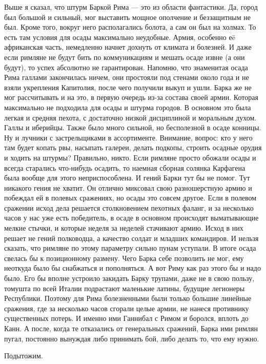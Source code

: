 Выше я сказал, что штурм Баркой Рима — это из области фантастики. Да, город был большой и сильный, мог выставить мощное ополчение и беззащитным не был. Кроме того, вокруг него располагались болота, а сам он был на холмах. То есть там условия для осады максимально неудобные. Армия, особенно еë африканская часть, немедленно начнет дохнуть от климата и болезней. И даже если римляне не будут бить по коммуникациям и мешать осаде извне (а они будут), то успех абсолютно не гарантирован. Напомню, что знаменитая осада Рима галлами закончилась ничем, они простояли под стенами около года и не взяли укрепления Капитолия, после чего получили выкуп и ушли. Барка же не мог рассчитывать и на это, в первую очередь из-за состава своей армии. Которая максимально не подходила для осады и штурма городов. В основном это была легкая и средняя пехота, с достаточно низкой дисциплиной и моральным духом. Галлы и иберийцы. Также было много сильной, но бесполезной в осаде конницы. Ну и лучники с застрельщиками в ассортименте. Внимание, вопрос: кто у него там будет копать рвы, насыпать галереи, делать подкопы, строить осадные орудия и ходить на штурмы? Правильно, никто. Если римляне просто обожали осады и всегда старались что-нибудь осадить, то наемная сборная солянка Карфагена была вообще для этого неприспособлена. И гений Барки тут бы не помог. Тут никакого гения не хватит. Он отлично миксовал свою разношерстную армию и побеждал ей в полевых сражениях, но осады это совсем другое. Если в полевом сражении исход дела решается столкновением пехотных фаланг, и за несколько часов у нас уже есть победитель, в осаде в основном происходят выматывающие мелкие стычки, и которые неделя за неделей стачивают армию. Исход в них решает не гений полководца, а качество солдат и младших командиров. И нельзя сказать, что римляне по этому параметру сильно пунам уступали. В итоге осада свелась бы к позиционному размену. Чего Барка себе позволить не мог, ему неоткуда было бы снабжаться и пополняться. А вот Риму как раз этого бы и надо было. Его бы вполне устроило закидать Барку трупами, даже не в свою пользу, томушта по всей Италии подрастают маленькие латины, будущие легионеры Республики. Поэтому для Рима болезненными были только большие линейные сражения, где за несколько часов сгорали целые армии, не нанеся противнику существенных потерь. И именно ими Ганнибал с Римом и боролся, вплоть до Канн. А после, когда те отказались от генеральных сражений, Барка ими римлян пугал, постоянно вынуждая либо принимать бой, либо делать то, что ему нужно.


Подытожим.

